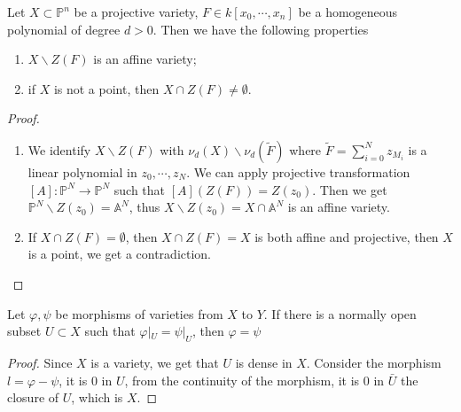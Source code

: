 \begin{corollary}
	Let $ X\subset \mathbb{P}^n $ be a projective variety, $ F\in k[x_0,\cdots,x_n] $ be a homogeneous polynomial of degree $ d>0 $. Then we have the following properties
	\begin{enumerate}
		\item $ X\backslash Z(F) $ is an affine variety;
		\item if $ X $ is not a point, then $ X\cap Z(F)\neq \emptyset $.
	\end{enumerate}
\end{corollary}
\begin{proof}
	\noindent\begin{enumerate}
		\item We identify $ X\backslash Z(F) $ with $ \nu_d(X)\backslash \nu_d(\tilde{F}) $ where $ \tilde{F}=\sum\limits_{i=0}^{N}z_{M_i} $ is a linear polynomial in $ z_0,\cdots,z_N $. We can apply projective transformation $ [A]:\mathbb{P}^N\to \mathbb{P}^N $ such that $ [A](Z(F))=Z(z_0) $. Then we get $ \mathbb{P}^N\backslash Z(z_0)=\mathbb{A}^N $, thus $ X\backslash Z(z_0) =X\cap\mathbb{A}^N$ is an affine variety.
		\item If $ X\cap Z(F)=\emptyset $, then $ X\cap Z(F)=X $ is both affine and projective, then $ X $ is a point, we get a contradiction.
	\end{enumerate}
\end{proof}
\begin{lemma}
	Let $ \varphi,\psi $ be morphisms of varieties from $ X $ to $ Y $. If there is a normally open subset $ U\subset X $ such that $ \varphi|_U=\psi|_U $, then $ \varphi=\psi $
\end{lemma}
\begin{proof}
	Since $ X $ is a variety, we get that $ U $ is dense in $ X $. Consider the morphism $ l=\varphi-\psi $, it is $ 0 $ in $ U $, from the continuity of the morphism, it is $ 0 $ in $ \bar{U} $ the closure of $ U $, which is $ X $.
\end{proof}


